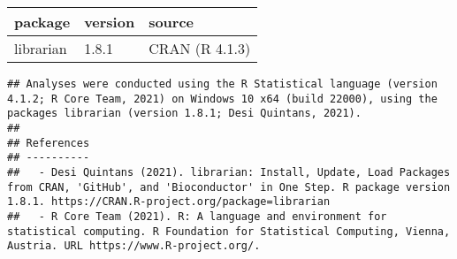 \documentclass[
]{article}
\begin{document}
\begin{longtable}[]{@{}lll@{}}
\toprule
package & version & source \\
\midrule
\endhead
librarian & 1.8.1 & CRAN (R 4.1.3) \\
\bottomrule
\end{longtable}

\begin{verbatim}
## Analyses were conducted using the R Statistical language (version 4.1.2; R Core Team, 2021) on Windows 10 x64 (build 22000), using the packages librarian (version 1.8.1; Desi Quintans, 2021).
## 
## References
## ----------
##   - Desi Quintans (2021). librarian: Install, Update, Load Packages from CRAN, 'GitHub', and 'Bioconductor' in One Step. R package version 1.8.1. https://CRAN.R-project.org/package=librarian
##   - R Core Team (2021). R: A language and environment for statistical computing. R Foundation for Statistical Computing, Vienna, Austria. URL https://www.R-project.org/.
\end{verbatim}
\end{document}
